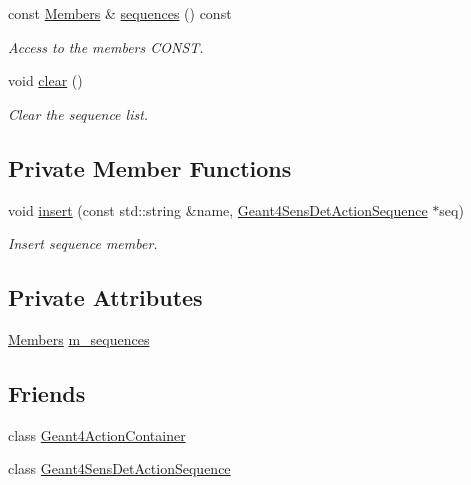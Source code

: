 \begin{DoxyCompactItemize}
const \hyperlink{class_d_d4hep_1_1_simulation_1_1_geant4_sens_det_sequences_a2266138a517dd9b784af9234312fdd12}{Members} \& \hyperlink{class_d_d4hep_1_1_simulation_1_1_geant4_sens_det_sequences_aacde15e4b1fb60c1ed56f438bc92db9a}{sequences} () const 
\begin{DoxyCompactList}\small\item\em Access to the members CONST. \item\end{DoxyCompactList}\item 
void \hyperlink{class_d_d4hep_1_1_simulation_1_1_geant4_sens_det_sequences_ad30860ebb23e7fbbaf18c8a7194ae6cc}{clear} ()
\begin{DoxyCompactList}\small\item\em Clear the sequence list. \item\end{DoxyCompactList}\end{DoxyCompactItemize}
\subsection*{Private Member Functions}
\begin{DoxyCompactItemize}
\item 
void \hyperlink{class_d_d4hep_1_1_simulation_1_1_geant4_sens_det_sequences_a4ec3cfb93ef16c90a28f451c58711692}{insert} (const std::string \&name, \hyperlink{class_d_d4hep_1_1_simulation_1_1_geant4_sens_det_action_sequence}{Geant4SensDetActionSequence} $\ast$seq)
\begin{DoxyCompactList}\small\item\em Insert sequence member. \item\end{DoxyCompactList}\end{DoxyCompactItemize}
\subsection*{Private Attributes}
\begin{DoxyCompactItemize}
\item 
\hyperlink{class_d_d4hep_1_1_simulation_1_1_geant4_sens_det_sequences_a2266138a517dd9b784af9234312fdd12}{Members} \hyperlink{class_d_d4hep_1_1_simulation_1_1_geant4_sens_det_sequences_a913b05e77e69effeeafbd0f7a604cd70}{m\_\-sequences}
\end{DoxyCompactItemize}
\subsection*{Friends}
\begin{DoxyCompactItemize}
\item 
class \hyperlink{class_d_d4hep_1_1_simulation_1_1_geant4_sens_det_sequences_a17a3e017d1d61a4f615d4e8eef0f98cb}{Geant4ActionContainer}
\item 
class \hyperlink{class_d_d4hep_1_1_simulation_1_1_geant4_sens_det_sequences_a0dd78d992a2c8dccba1ab80d814020cc}{Geant4SensDetActionSequence}
\end{DoxyCompactItemize}


